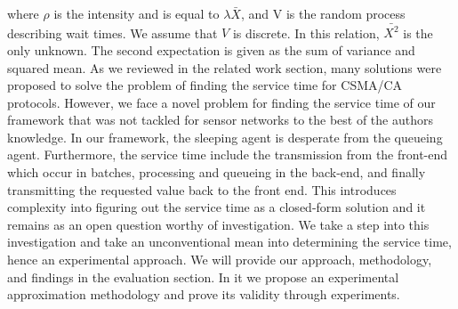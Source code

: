 where $\rho$ is the intensity and is equal to $\lambda \bar{X}$, and V is the random process describing wait times. We assume that $V$ is discrete. In this relation, $\bar{X^2}$ is the only unknown. The second expectation is given as the sum of variance and squared mean. As we reviewed in the related work section, many solutions were proposed to solve the problem of finding the service time for CSMA/CA protocols. However, we face a novel problem for finding the service time of our framework that was not tackled for sensor networks to the best of the authors knowledge. In our framework, the sleeping agent is desperate from the queueing agent. Furthermore, the service time include the transmission from the front-end which occur in batches, processing and queueing in the back-end, and finally transmitting the requested value back to the front end. This introduces complexity into figuring out the service time as a closed-form solution and it remains as an open question worthy of investigation. We take a step into this investigation and take an unconventional mean into determining the service time, hence an experimental approach. We will provide our approach, methodology, and findings in the evaluation section. In it we propose an experimental approximation methodology and prove its validity through experiments.

